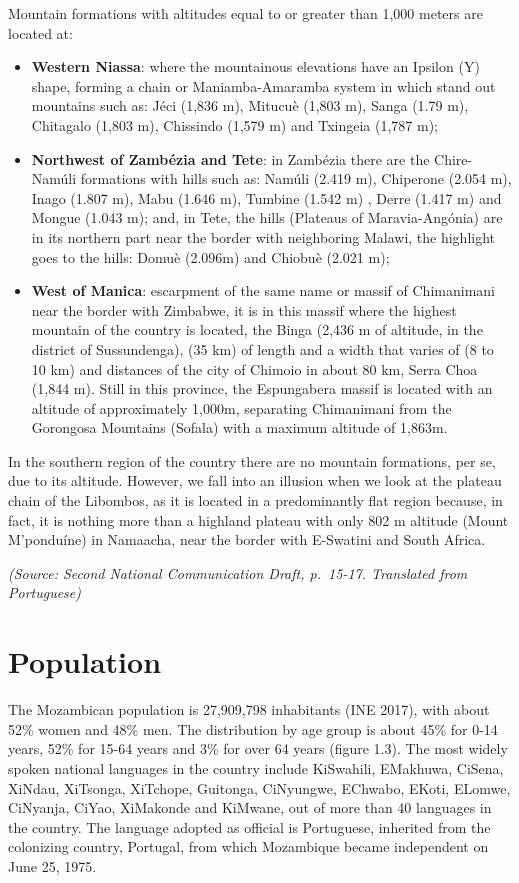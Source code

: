 \documentclass[
]{book}
\providecommand{\tightlist}{%
  \setlength{\itemsep}{0pt}\setlength{\parskip}{0pt}}
\begin{document}
Mountain formations with altitudes equal to or greater than 1,000 meters are located at:

\begin{itemize}
\tightlist
\item
  \textbf{Western Niassa}: where the mountainous elevations have an Ipsilon (Y) shape, forming a chain or Maniamba-Amaramba system in which stand out mountains such as: Jéci (1,836 m), Mitucuè (1,803 m), Sanga (1.79 m), Chitagalo (1,803 m), Chissindo (1,579 m) and Txingeia (1,787 m);
\item
  \textbf{Northwest of Zambézia and Tete}: in Zambézia there are the Chire-Namúli formations with hills such as: Namúli (2.419 m), Chiperone (2.054 m), Inago (1.807 m), Mabu (1.646 m), Tumbine (1.542 m) , Derre (1.417 m) and Mongue (1.043 m); and, in Tete, the hills (Plateaus of Maravia-Angónia) are in its northern part near the border with neighboring Malawi, the highlight goes to the hills: Domuè (2.096m) and Chiobuè (2.021 m);
\item
  \textbf{West of Manica}: escarpment of the same name or massif of Chimanimani near the border with Zimbabwe, it is in this massif where the highest mountain of the country is located, the Binga (2,436 m of altitude, in the district of Sussundenga), (35 km) of length and a width that varies of (8 to 10 km) and distances of the city of Chimoio in about 80 km, Serra Choa (1,844 m). Still in this province, the Espungabera massif is located with an altitude of approximately 1,000m, separating Chimanimani from the Gorongosa Mountains (Sofala) with a maximum altitude of 1,863m.
\end{itemize}

In the southern region of the country there are no mountain formations, per se, due to its altitude. However, we fall into an illusion when we look at the plateau chain of the Libombos, as it is located in a predominantly flat region because, in fact, it is nothing more than a highland plateau with only 802 m altitude (Mount M'ponduíne) in Namaacha, near the border with E-Swatini and South Africa.

\emph{(Source: Second National Communication Draft, p.~15-17. Translated from Portuguese)}

\hypertarget{population}{%
\section{Population}\label{population}}

The Mozambican population is 27,909,798 inhabitants (INE 2017), with about 52\% women and 48\% men. The distribution by age group is about 45\% for 0-14 years, 52\% for 15-64 years and 3\% for over 64 years (figure 1.3). The most widely spoken national languages in the country include KiSwahili, EMakhuwa, CiSena, XiNdau, XiTsonga, XiTchope, Guitonga, CiNyungwe, EChwabo, EKoti, ELomwe, CiNyanja, CiYao, XiMakonde and KiMwane, out of more than 40 languages in the country. The language adopted as official is Portuguese, inherited from the colonizing country, Portugal, from which Mozambique became independent on June 25, 1975.
\end{document}
